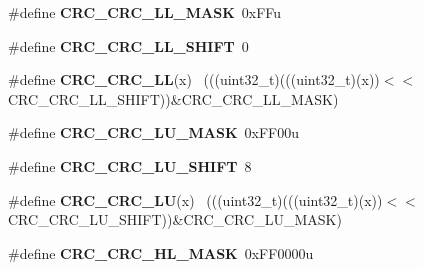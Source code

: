 \begin{DoxyCompactItemize}
\item 
\hypertarget{group___c_r_c___register___masks_ga4ed4d658d7b0998f99f2e7a67781b741}{}\#define {\bfseries C\+R\+C\+\_\+\+C\+R\+C\+\_\+\+L\+L\+\_\+\+M\+A\+S\+K}~0x\+F\+Fu\label{group___c_r_c___register___masks_ga4ed4d658d7b0998f99f2e7a67781b741}

\item 
\hypertarget{group___c_r_c___register___masks_ga33b62a4af618b4dced75e79b9e764609}{}\#define {\bfseries C\+R\+C\+\_\+\+C\+R\+C\+\_\+\+L\+L\+\_\+\+S\+H\+I\+F\+T}~0\label{group___c_r_c___register___masks_ga33b62a4af618b4dced75e79b9e764609}

\item 
\hypertarget{group___c_r_c___register___masks_ga2627598dd0397194169ba3d3fd351bcb}{}\#define {\bfseries C\+R\+C\+\_\+\+C\+R\+C\+\_\+\+L\+L}(x)                                                    ~(((uint32\+\_\+t)(((uint32\+\_\+t)(x))$<$$<$C\+R\+C\+\_\+\+C\+R\+C\+\_\+\+L\+L\+\_\+\+S\+H\+I\+F\+T))\&C\+R\+C\+\_\+\+C\+R\+C\+\_\+\+L\+L\+\_\+\+M\+A\+S\+K)\label{group___c_r_c___register___masks_ga2627598dd0397194169ba3d3fd351bcb}

\item 
\hypertarget{group___c_r_c___register___masks_gafd70dfedcb7a56d90936b633f6b72c8b}{}\#define {\bfseries C\+R\+C\+\_\+\+C\+R\+C\+\_\+\+L\+U\+\_\+\+M\+A\+S\+K}~0x\+F\+F00u\label{group___c_r_c___register___masks_gafd70dfedcb7a56d90936b633f6b72c8b}

\item 
\hypertarget{group___c_r_c___register___masks_gaf49b0d3034c80d25be6484b90f06d5a8}{}\#define {\bfseries C\+R\+C\+\_\+\+C\+R\+C\+\_\+\+L\+U\+\_\+\+S\+H\+I\+F\+T}~8\label{group___c_r_c___register___masks_gaf49b0d3034c80d25be6484b90f06d5a8}

\item 
\hypertarget{group___c_r_c___register___masks_gacf55a6aa9391f22a4c4760c9fd7f7a0c}{}\#define {\bfseries C\+R\+C\+\_\+\+C\+R\+C\+\_\+\+L\+U}(x)                                                    ~(((uint32\+\_\+t)(((uint32\+\_\+t)(x))$<$$<$C\+R\+C\+\_\+\+C\+R\+C\+\_\+\+L\+U\+\_\+\+S\+H\+I\+F\+T))\&C\+R\+C\+\_\+\+C\+R\+C\+\_\+\+L\+U\+\_\+\+M\+A\+S\+K)\label{group___c_r_c___register___masks_gacf55a6aa9391f22a4c4760c9fd7f7a0c}

\item 
\hypertarget{group___c_r_c___register___masks_ga3bda7420d175ce8cfc9acf5726265dad}{}\#define {\bfseries C\+R\+C\+\_\+\+C\+R\+C\+\_\+\+H\+L\+\_\+\+M\+A\+S\+K}~0x\+F\+F0000u\label{group___c_r_c___register___masks_ga3bda7420d175ce8cfc9acf5726265dad}


\end{DoxyCompactItemize}
